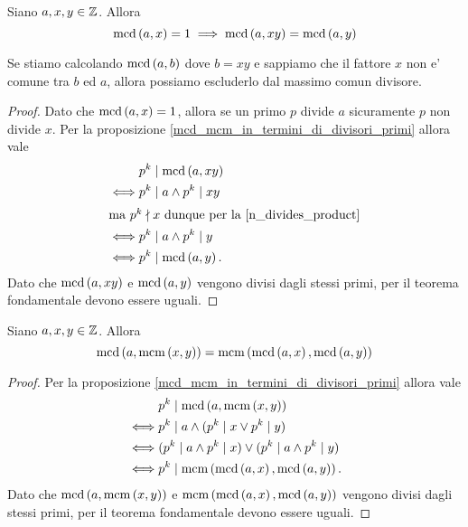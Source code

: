 \begin{proposition} \label{mcd_togliere_fattori_non_comuni}
    Siano $a, x, y \in \mathbb{Z}$. Allora 
    \begin{equation}
        \operatorname{mcd}\left(a, x\right) = 1 \implies \operatorname{mcd}\left(a, xy\right) = \operatorname{mcd}\left(a, y\right)
    \end{equation}
\end{proposition}
\begin{intuition}
    Se stiamo calcolando $\operatorname{mcd}\left(a, b\right)$ dove $b = xy$ e sappiamo che il fattore $x$ non e' comune tra $b$ ed $a$, allora possiamo escluderlo dal massimo comun divisore.
\end{intuition}
\begin{proof}
    Dato che $\operatorname{mcd}\left(a, x\right) = 1$, allora se un primo $p$ divide $a$ sicuramente $p$ non divide $x$. Per la proposizione \ref{mcd_mcm_in_termini_di_divisori_primi} allora vale
    \begin{alignat*}
        {1}
        &p^k \mid \operatorname{mcd}\left(a, xy\right) \\ 
        \iff &p^k \mid a \land p^k \mid xy\\
        \intertext{ma $p^k \nmid x$ dunque per la \ref{n_divides_product}}
        \iff &p^k \mid a \land p^k \mid y \\
        \iff &p^k \mid \operatorname{mcd}\left(a, y\right).
    \end{alignat*}
    Dato che $\operatorname{mcd}\left(a, xy\right)$ e $\operatorname{mcd}\left(a, y\right)$ vengono divisi dagli stessi primi, per il teorema fondamentale devono essere uguali.
\end{proof}

\begin{proposition} \label{distributivita_mcd_su_mcm}
    Siano $a, x, y \in \mathbb{Z}$. Allora 
    \begin{equation}
        \operatorname{mcd}\left(a, \operatorname{mcm}\left(x, y\right)\right) = \operatorname{mcm}\left(\operatorname{mcd}\left(a, x\right), \operatorname{mcd}\left(a, y\right)\right)
    \end{equation}
\end{proposition}
\begin{proof}
    Per la proposizione \ref{mcd_mcm_in_termini_di_divisori_primi} allora vale
    \begin{alignat*}
        {1}
        &p^k \mid \operatorname{mcd}\left(a, \operatorname{mcm}\left(x, y\right)\right)\\ 
        \iff &p^k \mid a \land (p^k \mid x \lor p^k \mid y)\\
        \iff &(p^k \mid a \land p^k \mid x) \lor (p^k \mid a \land p^k \mid y) \\
        \iff &p^k \mid \operatorname{mcm}\left(\operatorname{mcd}\left(a, x\right), \operatorname{mcd}\left(a, y\right)\right).
    \end{alignat*}
    Dato che $\operatorname{mcd}\left(a, \operatorname{mcm}\left(x, y\right)\right)$ e $\operatorname{mcm}\left(\operatorname{mcd}\left(a, x\right), \operatorname{mcd}\left(a, y\right)\right)$ vengono divisi dagli stessi primi, per il teorema fondamentale devono essere uguali.
\end{proof}

